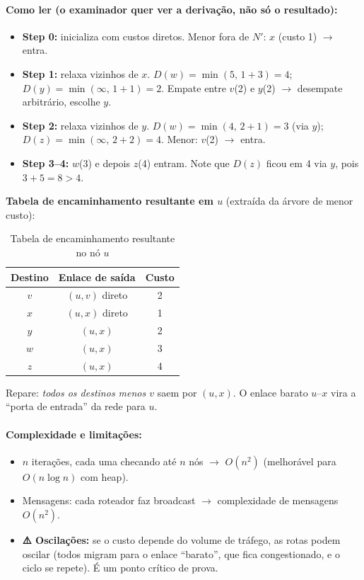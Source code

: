 \documentclass[11pt,a4paper]{article}
\begin{document}
\paragraph{Como ler (o examinador quer ver a derivação, não só o resultado):}
\begin{itemize}
    \item \textbf{Step 0:} inicializa com custos diretos. Menor fora de $N'$: $x$ (custo 1) $\to$ entra.
    \item \textbf{Step 1:} relaxa vizinhos de $x$. $D(w)=\min(5,\,1{+}3)=4$; $D(y)=\min(\infty,\,1{+}1)=2$. Empate entre $v$(2) e $y$(2) $\to$ desempate arbitrário, escolhe $y$.
    \item \textbf{Step 2:} relaxa vizinhos de $y$. $D(w)=\min(4,\,2{+}1)=3$ (via $y$); $D(z)=\min(\infty,\,2{+}2)=4$. Menor: $v$(2) $\to$ entra.
    \item \textbf{Step 3–4:} $w$(3) e depois $z$(4) entram. Note que $D(z)$ ficou em 4 via $y$, pois $3{+}5=8 > 4$.
\end{itemize}

\textbf{Tabela de encaminhamento resultante em $u$} (extraída da árvore de menor custo):

\begin{table}[h!]
\centering
\caption{Tabela de encaminhamento resultante no nó $u$}
\label{tab:encaminhamento_u}
\begin{tabular}{c c c}
\toprule
\textbf{Destino} & \textbf{Enlace de saída} & \textbf{Custo} \\
\midrule
$v$ & $(u,v)$ direto & 2 \\
$x$ & $(u,x)$ direto & 1 \\
$y$ & $(u,x)$ & 2 \\
$w$ & $(u,x)$ & 3 \\
$z$ & $(u,x)$ & 4 \\
\bottomrule
\end{tabular}
\end{table}

\begin{nota}
Repare: \textit{todos os destinos menos $v$} saem por $(u,x)$. O enlace barato $u$–$x$ vira a ``porta de entrada'' da rede para $u$.
\end{nota}

\paragraph{Complexidade e limitações:}
\begin{itemize}
    \item $n$ iterações, cada uma checando até $n$ nós $\to$ $O(n^2)$ (melhorável para $O(n\log n)$ com heap).
    \item Mensagens: cada roteador faz broadcast $\to$ complexidade de mensagens $O(n^2)$.
    \item \textbf{⚠️ Oscilações:} se o custo depende do volume de tráfego, as rotas podem oscilar (todos migram para o enlace ``barato'', que fica congestionado, e o ciclo se repete). É um ponto crítico de prova.
\end{itemize}
\end{document}
